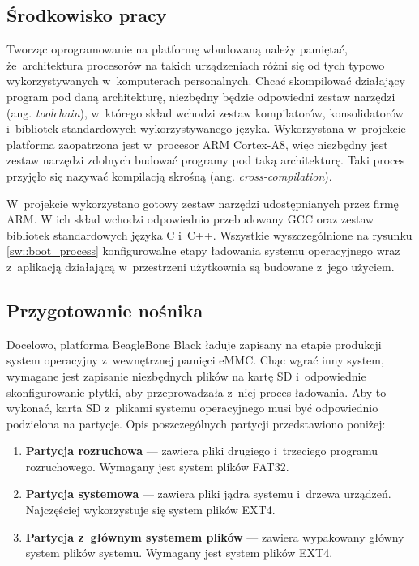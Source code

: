 \subsection{Środkowisko pracy}

Tworząc oprogramowanie na platformę wbudowaną należy pamiętać, że~architektura
procesorów na takich urządzeniach różni się od tych typowo wykorzystywanych
w~komputerach personalnych. Chcać skompilować działający program pod daną
architekturę, niezbędny będzie odpowiedni zestaw narzędzi (ang.
\textit{toolchain}), w~którego skład wchodzi zestaw kompilatorów, konsolidatorów
i~bibliotek standardowych wykorzystywanego języka. Wykorzystana w~projekcie
platforma zaopatrzona jest w~procesor ARM Cortex-A8, więc niezbędny jest zestaw
narzędzi zdolnych budować programy pod taką architekturę. Taki proces przyjęło
się nazywać kompilacją skrośną (ang. \textit{cross-compilation}). \par
W~projekcie wykorzystano gotowy zestaw narzędzi udostępnianych przez firmę ARM.
W ich skład wchodzi odpowiednio przebudowany GCC oraz zestaw bibliotek
standardowych języka C i~C++. Wszystkie wyszczególnione na rysunku
\ref{sw::boot_process} konfigurowalne etapy ładowania systemu operacyjnego wraz
z~aplikacją działającą w~przestrzeni użytkownia są budowane z~jego użyciem.

\subsection{Przygotowanie nośnika}

Docelowo, platforma BeagleBone Black ładuje zapisany na etapie produkcji system
operacyjny z~wewnętrznej pamięci eMMC. Chąc wgrać inny system, wymagane jest
zapisanie niezbędnych plików na kartę SD i~odpowiednie skonfigurowanie płytki,
aby przeprowadzała z~niej proces ładowania. Aby to wykonać, karta SD z~plikami
systemu operacyjnego musi być odpowiednio podzielona na partycje. Opis
poszczególnych partycji przedstawiono poniżej:

\begin{enumerate}

    \item \textbf{Partycja rozruchowa} --- zawiera pliki drugiego i~trzeciego programu
    rozruchowego. Wymagany jest system plików FAT32.

    \item \textbf{Partycja systemowa} --- zawiera pliki jądra systemu i~drzewa
    urządzeń. Najczęściej wykorzystuje się system plików EXT4.

    \item \textbf{Partycja z~głównym systemem plików} --- zawiera wypakowany
    główny system plików systemu. Wymagany jest system plików EXT4.

\end{enumerate}

